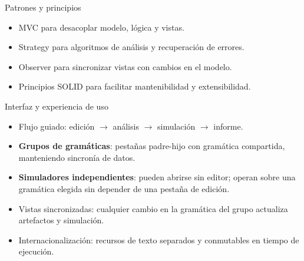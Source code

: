 \begin{frame}{Patrones y principios}
  \begin{itemize}
    \item MVC para desacoplar modelo, lógica y vistas.
    \item Strategy para algoritmos de análisis y recuperación de errores.
    \item Observer para sincronizar vistas con cambios en el modelo.
    \item Principios SOLID para facilitar mantenibilidad y extensibilidad.
  \end{itemize}
\end{frame}

\begin{frame}{Interfaz y experiencia de uso}
  \begin{itemize}
    \item Flujo guiado: edición \(\rightarrow\) análisis \(\rightarrow\) simulación \(\rightarrow\) informe.
    \item \textbf{Grupos de gramáticas}: pestañas padre-hijo con gramática compartida, manteniendo sincronía de datos.
    \item \textbf{Simuladores independientes}: pueden abrirse sin editor; operan sobre una gramática elegida sin depender de una pestaña de edición.
    \item Vistas sincronizadas: cualquier cambio en la gramática del grupo actualiza artefactos y simulación.
    \item Internacionalización: recursos de texto separados y conmutables en tiempo de ejecución.
  \end{itemize}
\end{frame}


